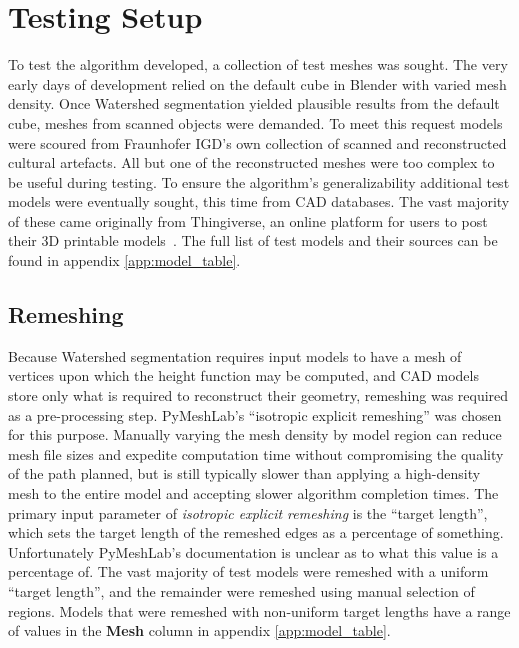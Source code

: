 
\section{Testing Setup}

To test the algorithm developed, a collection of test meshes was sought.
The very early days of development relied on the default cube in Blender with varied mesh density.
Once Watershed segmentation yielded plausible results from the default cube, meshes from scanned objects were demanded.
To meet this request models were scoured from Fraunhofer IGD's own collection of scanned and reconstructed cultural artefacts.
All but one of the reconstructed meshes were too complex to be useful during testing.
To ensure the algorithm's generalizability additional test models were eventually sought, this time from CAD databases.
The vast majority of these came originally from Thingiverse, an online platform for users to post their 3D printable models~\cite{Thingiverse}.
The full list of test models and their sources can be found in appendix \ref{app:model_table}.

\subsection{Remeshing}
Because Watershed segmentation requires input models to have a mesh of vertices upon which the height function may be computed, and CAD models store only what is required to reconstruct their geometry, remeshing was required as a pre-processing step.
PyMeshLab's ``isotropic explicit remeshing''\cite{PyMeshLab} was chosen for this purpose.
Manually varying the mesh density by model region can reduce mesh file sizes and expedite computation time without compromising the quality of the path planned, but is still typically slower than applying a high-density mesh to the entire model and accepting slower algorithm completion times.
The primary input parameter of \textit{isotropic explicit remeshing} is the ``target length'', which sets the target length of the remeshed edges as a percentage of something.
Unfortunately PyMeshLab's documentation is unclear as to what this value is a percentage of.
The vast majority of test models were remeshed with a uniform ``target length'', and the remainder were remeshed using manual selection of regions.
Models that were remeshed with non-uniform target lengths have a range of values in the \textbf{Mesh} column in appendix \ref{app:model_table}.

